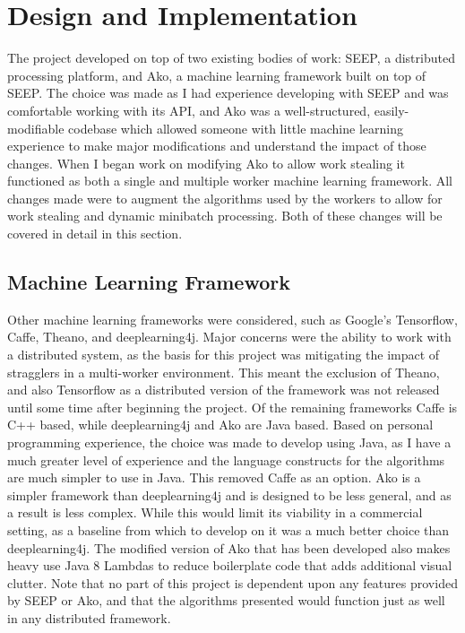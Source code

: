 \documentclass[12pt]{article}
\begin{document}
\section{Design and Implementation}

The project developed on top of two existing bodies of work: SEEP, a distributed processing platform, and Ako, a machine learning framework built on top of SEEP. The choice was made as I had experience developing with SEEP and was comfortable working with its API, and Ako was a well-structured, easily-modifiable codebase which allowed someone with little machine learning experience to make major modifications and understand the impact of those changes. When I began work on modifying Ako to allow work stealing it functioned as both a single and multiple worker machine learning framework. All changes made were to augment the algorithms used by the workers to allow for work stealing and dynamic minibatch processing. Both of these changes will be covered in detail in this section.

\subsection{Machine Learning Framework}

Other machine learning frameworks were considered, such as Google's Tensorflow, Caffe, Theano, and deeplearning4j. Major concerns were the ability to work with a distributed system, as the basis for this project was mitigating the impact of stragglers in a multi-worker environment. This meant the exclusion of Theano, and also Tensorflow as a distributed version of the framework was not released until some time after beginning the project. Of the remaining frameworks Caffe is C++ based, while deeplearning4j and Ako are Java based. Based on personal programming experience, the choice was made to develop using Java, as I have a much greater level of experience and the language constructs for the algorithms are much simpler to use in Java. This removed Caffe as an option. Ako is a simpler framework than deeplearning4j and is designed to be less general, and as a result is less complex. While this would limit its viability in a commercial setting, as a baseline from which to develop on it was a much better choice than deeplearning4j. The modified version of Ako that has been developed also makes heavy use Java 8 Lambdas to reduce boilerplate code that adds additional visual clutter.
\newline
\newline
Note that no part of this project is dependent upon any features provided by SEEP or Ako, and that the algorithms presented would function just as well in any distributed framework.
\end{document}
